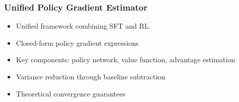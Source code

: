\begin{frame}
\frametitle{Unified Policy Gradient Estimator}
\begin{itemize}
  \item Unified framework combining SFT and RL
  \item Closed-form policy gradient expressions
  \item Key components: policy network, value function, advantage estimation
  \item Variance reduction through baseline subtraction
  \item Theoretical convergence guarantees
\end{itemize}
\end{frame}